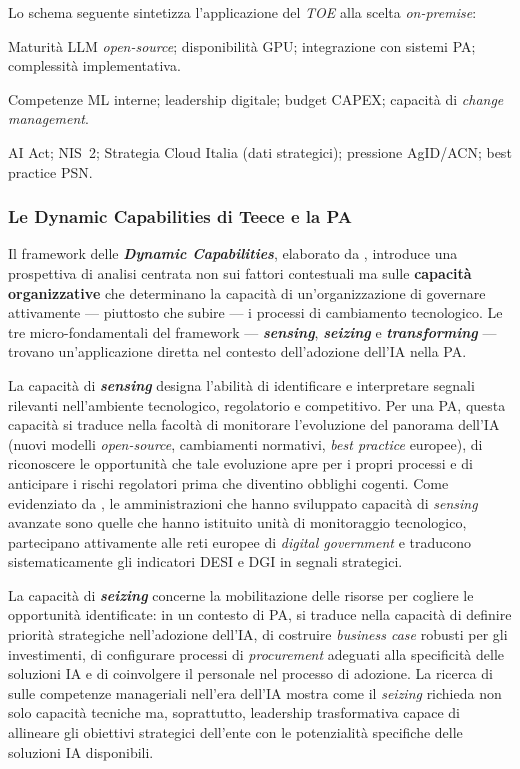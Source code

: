 Lo schema seguente sintetizza l'applicazione del \textit{TOE} alla scelta \textit{on-premise}:

\begin{description}[noitemsep]
  \item[Contesto Tecnologico] Maturità LLM \textit{open-source}; disponibilità GPU; integrazione con sistemi PA; complessità implementativa.
  \item[Contesto Organizzativo] Competenze ML interne; leadership digitale; budget CAPEX; capacità di \textit{change management}.
  \item[Contesto Ambientale] AI Act; NIS~2; Strategia Cloud Italia (dati strategici); pressione AgID/ACN; best practice PSN.
\end{description}

\subsubsection*{Le Dynamic Capabilities di Teece e la PA}

Il framework delle \textbf{\textit{Dynamic Capabilities}}, elaborato da \textcite{Teece2007}, introduce una prospettiva di analisi centrata non sui fattori contestuali ma sulle \textbf{capacità organizzative} che determinano la capacità di un'organizzazione di governare attivamente — piuttosto che subire — i processi di cambiamento tecnologico. Le tre micro-fondamentali del framework — \textbf{\textit{sensing}}, \textbf{\textit{seizing}} e \textbf{\textit{transforming}} — trovano un'applicazione diretta nel contesto dell'adozione dell'IA nella PA.

La capacità di \textbf{\textit{sensing}} designa l'abilità di identificare e interpretare segnali rilevanti nell'ambiente tecnologico, regolatorio e competitivo. Per una PA, questa capacità si traduce nella facoltà di monitorare l'evoluzione del panorama dell'IA (nuovi modelli \textit{open-source}, cambiamenti normativi, \textit{best practice} europee), di riconoscere le opportunità che tale evoluzione apre per i propri processi e di anticipare i rischi regolatori prima che diventino obblighi cogenti. Come evidenziato da \textcite{RolandBergerDC2025}, le amministrazioni che hanno sviluppato capacità di \textit{sensing} avanzate sono quelle che hanno istituito unità di monitoraggio tecnologico, partecipano attivamente alle reti europee di \textit{digital government} e traducono sistematicamente gli indicatori DESI e DGI in segnali strategici.

La capacità di \textbf{\textit{seizing}} concerne la mobilitazione delle risorse per cogliere le opportunità identificate: in un contesto di PA, si traduce nella capacità di definire priorità strategiche nell'adozione dell'IA, di costruire \textit{business case} robusti per gli investimenti, di configurare processi di \textit{procurement} adeguati alla specificità delle soluzioni IA e di coinvolgere il personale nel processo di adozione. La ricerca di \textcite{DelBaroneTOE2025} sulle competenze manageriali nell'era dell'IA mostra come il \textit{seizing} richieda non solo capacità tecniche ma, soprattutto, leadership trasformativa capace di allineare gli obiettivi strategici dell'ente con le potenzialità specifiche delle soluzioni IA disponibili.

